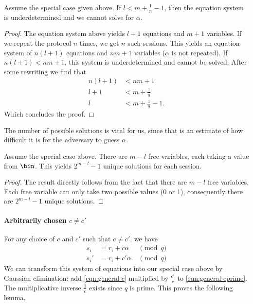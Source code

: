 \begin{lemma}
  Assume the special case given above.
  If \(l < m+\frac{1}{n}-1\), then the equation system is underdetermined and 
  we cannot solve for \(\alpha\).
\end{lemma}
\begin{proof}
  The equation system above yields \(l+1\) equations and \(m+1\) variables.
  If we repeat the protocol \(n\) times, we get \(n\) such sessions.
  This yields an equation system of \(n(l+1)\) equations and \(nm+1\) variables 
  (\(\alpha\) is not repeated).
  If \(n(l+1) < nm+1\), this system is underdetermined and cannot be solved.
  After some rewriting we find that
  \begin{align*}
    n(l+1) &< nm+1 \\
    l+1 &< m + \frac{1}{n} \\
    l &< m + \frac{1}{n} -1.
  \end{align*}
  Which concludes the proof.
\end{proof}

The number of possible solutions is vital for us, since that is an estimate of 
how difficult it is for the adversary to guess \(\alpha\).

\begin{lemma}\label{simple-l-bit-advantage}
  Assume the special case above.
  There are \(m-l\) free variables, each taking a value from \(\bin\).
  This yields \(2^{m-l}-1\) unique solutions for each session.
\end{lemma}
\begin{proof}
  The result directly follows from the fact that there are \(m-l\) free 
  variables.
  Each free variable can only take two possible values (0 or 1), consequently 
  there are \(2^{m-l}-1\) unique solutions.
\end{proof}

\paragraph*{Arbitrarily chosen \(c\neq c'\)}

For any choice of \(c\) and \(c'\) such that \(c\neq c'\), we have
\begin{align}
  \label{eqn:general-c}
  s_i &= r_i + c\alpha &\pmod q\\
  \label{eqn:general-cprime}
  s_i' &= r_i + c'\alpha. &\pmod q
\end{align}
We can transform this system of equations into our special case above by 
Gaussian elimination: add \cref{eqn:general-c} multiplied by \(\frac{c'}{c}\) 
to \cref{eqn:general-cprime}.
The multiplicative inverse \(\frac{1}{c}\) exists since \(q\) is prime.
This proves the following lemma.

